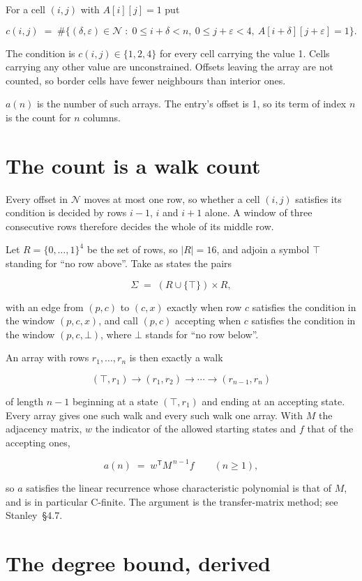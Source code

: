 \documentclass[11pt]{article}
\theoremstyle{definition}
\begin{document}
For a cell $(i,j)$ with $A[i][j] = 1$ put

\[c(i,j) \;=\; \#\bigl\{(\delta,\varepsilon)\in\mathcal{N} \;:\; 0\le i+\delta<n,\ 0\le j+\varepsilon<4,\ A[i+\delta][j+\varepsilon] = 1\bigr\}.\]

The condition is $c(i,j) \in \{1, 2, 4\}$ for every cell carrying the value 1. Cells carrying any other value are unconstrained. Offsets leaving the array are not counted, so border cells have fewer neighbours than interior ones.

$a(n)$ is the number of such arrays. The entry's offset is 1, so its term of index $n$ is the count for $n$ columns.

\section{The count is a walk count}

Every offset in $\mathcal{N}$ moves at most one row, so whether a cell $(i,j)$ satisfies its condition is decided by rows $i-1$, $i$ and $i+1$ alone. A window of three consecutive rows therefore decides the whole of its middle row.

Let $R = \{0,\dots,1\}^{4}$ be the set of rows, so $|R| = 16$, and adjoin a symbol $\top$ standing for ``no row above''. Take as states the pairs

\[\Sigma \;=\; (R \cup \{\top\}) \times R,\]

with an edge from $(p,c)$ to $(c,x)$ exactly when row $c$ satisfies the condition in the window $(p,c,x)$, and call $(p,c)$ accepting when $c$ satisfies the condition in the window $(p,c,\bot)$, where $\bot$ stands for ``no row below''.

An array with rows $r_1,\dots,r_n$ is then exactly a walk

\[(\top,r_1) \to (r_1,r_2) \to \cdots \to (r_{n-1},r_n)\]

of length $n-1$ beginning at a state $(\top,r_1)$ and ending at an accepting state. Every array gives one such walk and every such walk one array. With $M$ the adjacency matrix, $w$ the indicator of the allowed starting states and $f$ that of the accepting ones,

\[a(n) \;=\; w^{\mathsf T} M^{\,n-1} f \qquad (n \ge 1),\]

so $a$ satisfies the linear recurrence whose characteristic polynomial is that of $M$, and is in particular C-finite. The argument is the transfer-matrix method; see Stanley~\S4.7.

\section{The degree bound, derived}
\end{document}
